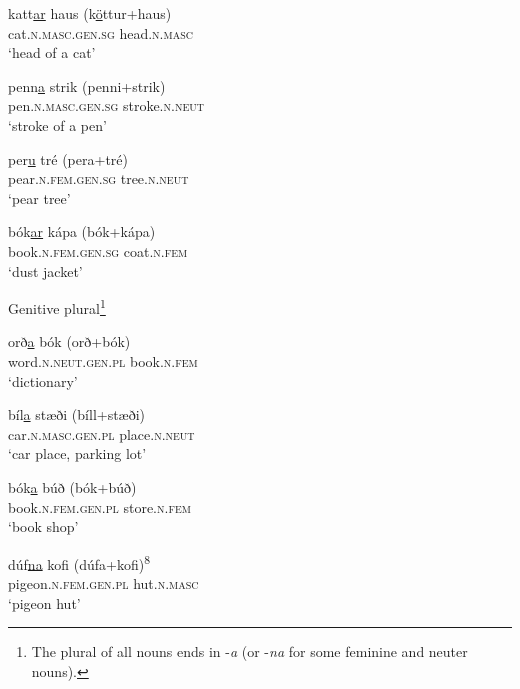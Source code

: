 \documentclass[output=paper]{LSP/langsci}
\begin{document}
\begin{xlist}
\begin{xlist}
\begin{xlist}
	\gll katt\underline{ar} haus (k\underline{ö}ttur+haus)  \\
	 cat\textsc{.n.masc.gen.sg} head\textsc{.n.masc}\\
	\glt ‘head of a cat’

	\gll penn\underline{a} strik (penni+strik){\rmfnm}  \\
	 pen\textsc{.n.masc.gen.sg} stroke\textsc{.n.neut}\\
\glt ‘stroke of a pen’ 

	\gll per\underline{u} tré  (pera+tré) \\
	 pear\textsc{.n.fem.gen.sg} tree\textsc{.n.neut}\\
	\glt ‘pear tree’

	\gll bók\underline{ar} kápa (bók+kápa) \\
	 book\textsc{.n.fem.gen.sg} coat\textsc{.n.fem}\\
	\glt ‘dust jacket’
\end{xlist}
 Genitive plural\footnote{The  plural of all nouns ends in -\textit{a} (or -\textit{na} for some feminine and neuter nouns).}
  \begin{xlist}
	\gll orð\underline{a} bók (orð+bók)\\
	 word\textsc{.n.neut.gen.pl} book\textsc{.n.fem}\\
	\glt ‘dictionary’

	\gll bíl\underline{a} stæði (bíll+stæði) \\
	 car\textsc{.n.masc.gen.pl} place\textsc{.n.neut}\\
	\glt ‘car place, parking lot’

	\gll bók\underline{a} búð (bók+búð) \\
	 book\textsc{.n.fem.gen.pl} store\textsc{.n.fem}\\
	\glt ‘book shop’

	\gll dúf\underline{na} kofi (dúfa+kofi)\textsuperscript{8} \\
	 pigeon\textsc{.n.fem.gen.pl} hut\textsc{.n.masc}\\
	\glt ‘pigeon hut’
\end{xlist}
\end{xlist}
\end{xlist}
\z 
\end{document}

